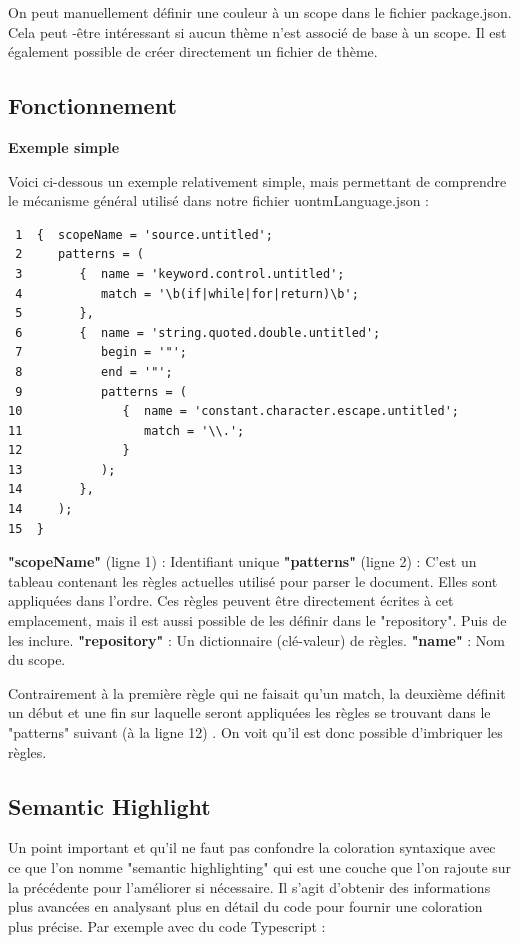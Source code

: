\documentclass[
    iict, %
    il, %
]{heig-tb}
\begin{document}
On peut manuellement définir une couleur à un scope dans le fichier package.json.
Cela peut -être intéressant si aucun thème n'est associé de base à un scope.
Il est également possible de créer directement un fichier de thème.

\subsection{Fonctionnement}
\textbf{Exemple simple}

Voici ci-dessous un exemple relativement simple, mais permettant de comprendre le mécanisme général utilisé dans notre fichier uontmLanguage.json :
\begin{lstlisting}
 1  {  scopeName = 'source.untitled';
 2     patterns = (
 3        {  name = 'keyword.control.untitled';
 4           match = '\b(if|while|for|return)\b';
 5        },
 6        {  name = 'string.quoted.double.untitled';
 7           begin = '"';
 8           end = '"';
 9           patterns = (
10              {  name = 'constant.character.escape.untitled';
11                 match = '\\.';
12              }
13           );
14        },
14     );
15  }
\end{lstlisting}

\textbf{"scopeName"} (ligne 1) : Identifiant unique
\textbf{"patterns"} (ligne 2) : C'est un tableau contenant les règles actuelles utilisé pour parser le document. Elles sont appliquées dans l'ordre.
Ces règles peuvent être directement écrites à cet emplacement, mais il est aussi possible de les définir dans le "repository". Puis de les inclure.
\textbf{"repository"} : Un dictionnaire (clé-valeur) de règles.
\textbf{"name"} : Nom du scope.

Contrairement à la première règle qui ne faisait qu'un match, la deuxième définit un début et une fin sur laquelle seront appliquées les règles se trouvant dans le "patterns" suivant (à la ligne 12) . On voit qu'il est donc possible d'imbriquer les règles.

\subsection{Semantic Highlight}

Un point important et qu'il ne faut pas confondre la coloration syntaxique avec ce que l'on nomme "semantic highlighting" qui est une couche que l'on rajoute sur la précédente pour l'améliorer si nécessaire.
Il s'agit d'obtenir des informations plus avancées en analysant plus en détail du code pour fournir une coloration plus précise.
Par exemple avec du code Typescript :
\end{document}
